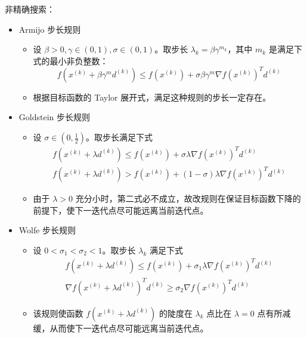 \begin{remark}
    非精确搜索：
    \begin{itemize}
        \item Armijo 步长规则\begin{itemize}
            \item 设 $\beta > 0, \gamma \in (0, 1), \sigma \in (0, 1)$。取步长 $\lambda_k = \beta \gamma^{m_k}$，其中 $m_k$ 是满足下式的最小非负整数：\[f\left(x^{(k)}+\beta \gamma^{m} d^{(k)}\right) \leq f\left(x^{(k)}\right)+\sigma \beta \gamma^{m} \nabla f\left(x^{(k)}\right)^{T} d^{(k)}\]
            \item 根据目标函数的 Taylor 展开式，满足这种规则的步长一定存在。
        \end{itemize}
        \item Goldstein 步长规则\begin{itemize}
            \item 设 $\sigma \in (0, \frac{1}{2})$。取步长满足下式\begin{gather*}
                f\left(x^{(k)}+\lambda d^{(k)}\right) \leq f\left(x^{(k)}\right)+\sigma \lambda \nabla f\left(x^{(k)}\right)^{T} d^{(k)} \\
                f\left(x^{(k)}+\lambda d^{(k)}\right)>f\left(x^{(k)}\right)+(1-\sigma) \lambda \nabla f\left(x^{(k)}\right)^{T} d^{(k)}
            \end{gather*}
            \item 由于 $\lambda > 0$ 充分小时，第二式必不成立，故改规则在保证目标函数下降的前提下，使下一迭代点尽可能远离当前迭代点。
        \end{itemize}
        \item Wolfe 步长规则\begin{itemize}
            \item 设 $0 < \sigma_1 < \sigma_2 < 1$。取步长 $\lambda_k$ 满足下式\begin{gather*}
                f\left(x^{(k)}+\lambda d^{(k)}\right) \leq f\left(x^{(k)}\right)+\sigma_{1} \lambda \nabla f\left(x^{(k)}\right)^{T} d^{(k)} \\
                \nabla f\left(x^{(k)}+\lambda d^{(k)}\right)^{T} d^{(k)} \geq \sigma_{2} \nabla f\left(x^{(k)}\right)^{T} d^{(k)}
            \end{gather*}
            \item 该规则使函数 $f(x^{(k)} + \lambda d^{(k)})$ 的陡度在 $\lambda_k$ 点比在 $\lambda = 0$ 点有所减缓，从而使下一迭代点尽可能远离当前迭代点。
        \end{itemize}
    \end{itemize}
\end{remark}

